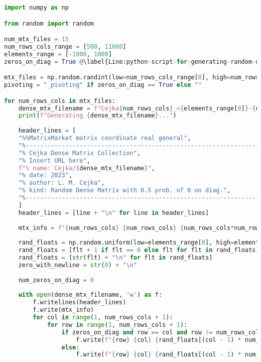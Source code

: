 \begin{lstlisting}[caption={Implementation of the \code{generate-rand-dense-mtxs.py} script used to generate dense matrices in the Matrix Market File Format, as described in Section~\ref{Subsection:implementation->decomposition-project->benchmarks}.
Each element in the matrix is randomly generated within the range of -1000 to 1000.
The \code{zeros\_on\_diag} variable, declared on Line~\ref{Line:python-script-for-generating-random-dense-matrices->script->zeros-on-diag-variable}, serves as a flag indicating whether the dense matrix can have zeros on its main diagonal.
When the variable is set to \code{True}, there is a 50\% chance for each element on the main diagonal to be a zero, as shown on Line~\ref{Line:python-script-for-generating-random-dense-matrices->script->zero-in-element-of-main-diagonal}.},label={Listing:python-script-for-generating-random-dense-matrices->script},language=Python,escapechar=@]
import numpy as np

from random import random

num_mtx_files = 15
num_rows_cols_range = [500, 11000]
elements_range = [-1000, 1000]
zeros_on_diag = True @\label{Line:python-script-for-generating-random-dense-matrices->script->zeros-on-diag-variable}@

mtx_files = np.random.randint(low=num_rows_cols_range[0], high=num_rows_cols_range[1], size=num_mtx_files)
pivoting = "_pivoting" if zeros_on_diag == True else ""

for num_rows_cols in mtx_files:
	dense_mtx_filename = f"Cejka{num_rows_cols}_<{elements_range[0]}-{elements_range[1]}>{pivoting}.mtx"
	print(f"Generating {dense_mtx_filename}...")
	
	header_lines = [
	"%%MatrixMarket matrix coordinate real general",
	"%---------------------------------------------------------------------",
	"% Cejka Dense Matrix Collection",
	"% Insert URL here",
	f"% name: Cejka/{dense_mtx_filename}",
	"% date: 2023",
	"% author: L. M. Cejka",
	"% kind: Random Dense Matrix with 0.5 prob. of 0 on diag.",
	"%---------------------------------------------------------------------",
	]
	header_lines = [line + "\n" for line in header_lines]
	
	mtx_info = f"{num_rows_cols} {num_rows_cols} {num_rows_cols*num_rows_cols}\n"
	
	rand_floats = np.random.uniform(low=elements_range[0], high=elements_range[1], size=(num_rows_cols*num_rows_cols,))
	rand_floats = [flt + 1 if flt == 0 else flt for flt in rand_floats]
	rand_floats = [str(flt) + "\n" for flt in rand_floats]
	zero_with_newline = str(0) + "\n"
	
	num_zeros_on_diag = 0
	
	with open(dense_mtx_filename, 'w') as f:
		f.writelines(header_lines)
		f.write(mtx_info)
		for col in range(1, num_rows_cols + 1):
			for row in range(1, num_rows_cols + 1):
				if zeros_on_diag and row == col and row != num_rows_cols:
					f.write(f"{row} {col} {rand_floats[(col - 1) * num_rows_cols + row - 1] if random() < 0.5 else zero_with_newline}") @\label{Line:python-script-for-generating-random-dense-matrices->script->zero-in-element-of-main-diagonal}@
				else:
					f.write(f"{row} {col} {rand_floats[(col - 1) * num_rows_cols + row - 1]}")
\end{lstlisting}